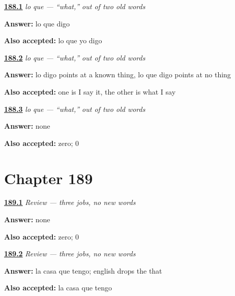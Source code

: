 \noindent\begin{minipage}[t]{\linewidth}
\raggedright
\hyperlink{review-ES-C53-lo-que-say}{\textbf{188.1}} \emph{lo que — \textquotedblleft{}what,\textquotedblright{} out of two old words}\par
\small \textbf{Answer:} lo que digo\par
\footnotesize \textbf{Also accepted:} lo que yo digo
\end{minipage}\par\medskip

\noindent\begin{minipage}[t]{\linewidth}
\raggedright
\hyperlink{review-ES-C53-lo-que-contrast}{\textbf{188.2}} \emph{lo que — \textquotedblleft{}what,\textquotedblright{} out of two old words}\par
\small \textbf{Answer:} lo digo points at a known thing, lo que digo points at no thing\par
\footnotesize \textbf{Also accepted:} one is I say it, the other is what I say
\end{minipage}\par\medskip

\noindent\begin{minipage}[t]{\linewidth}
\raggedright
\hyperlink{review-ES-C53-lo-que-new}{\textbf{188.3}} \emph{lo que — \textquotedblleft{}what,\textquotedblright{} out of two old words}\par
\small \textbf{Answer:} none\par
\footnotesize \textbf{Also accepted:} zero; 0
\end{minipage}\par\medskip

\section*{Chapter 189}

\noindent\begin{minipage}[t]{\linewidth}
\raggedright
\hyperlink{review-ES-C53-repaso-que-none}{\textbf{189.1}} \emph{Review — three jobs, no new words}\par
\small \textbf{Answer:} none\par
\footnotesize \textbf{Also accepted:} zero; 0
\end{minipage}\par\medskip

\noindent\begin{minipage}[t]{\linewidth}
\raggedright
\hyperlink{review-ES-C53-repaso-que-drop}{\textbf{189.2}} \emph{Review — three jobs, no new words}\par
\small \textbf{Answer:} la casa que tengo; english drops the that\par
\footnotesize \textbf{Also accepted:} la casa que tengo
\end{minipage}\par\medskip

